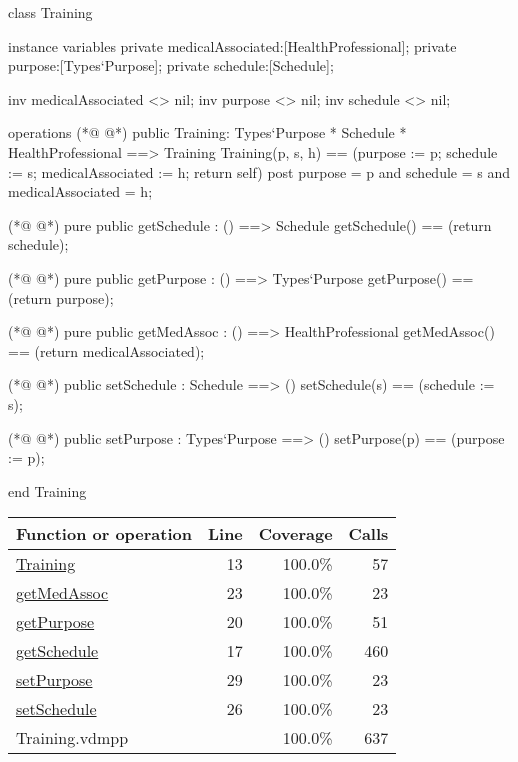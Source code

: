\begin{vdmpp}[breaklines=true]
class Training
 
instance variables
 private medicalAssociated:[HealthProfessional];
 private purpose:[Types`Purpose];
 private schedule:[Schedule];

 inv medicalAssociated <> nil;
 inv purpose <> nil;
 inv schedule <> nil;

operations
(*@
\label{Training:13}
@*)
 public Training: Types`Purpose * Schedule * HealthProfessional ==> Training
   Training(p, s, h) == (purpose := p; schedule := s; medicalAssociated := h; return self)
 post purpose = p and schedule = s and medicalAssociated = h;

(*@
\label{getSchedule:17}
@*)
 pure public getSchedule : () ==> Schedule
   getSchedule() == (return schedule);
 
(*@
\label{getPurpose:20}
@*)
  pure public getPurpose : () ==> Types`Purpose
  getPurpose() == (return purpose); 
 
(*@
\label{getMedAssoc:23}
@*)
 pure public getMedAssoc : () ==> HealthProfessional
  getMedAssoc() == (return medicalAssociated); 

(*@
\label{setSchedule:26}
@*)
 public setSchedule : Schedule ==> ()
   setSchedule(s) == (schedule := s);
 
(*@
\label{setPurpose:29}
@*)
 public setPurpose : Types`Purpose ==> ()
   setPurpose(p) == (purpose := p);
 
 end Training
\end{vdmpp}
\bigskip
\begin{longtable}{|l|r|r|r|}
\hline
Function or operation & Line & Coverage & Calls \\
\hline
\hline
\hyperref[Training:13]{Training} & 13&100.0\% & 57 \\
\hline
\hyperref[getMedAssoc:23]{getMedAssoc} & 23&100.0\% & 23 \\
\hline
\hyperref[getPurpose:20]{getPurpose} & 20&100.0\% & 51 \\
\hline
\hyperref[getSchedule:17]{getSchedule} & 17&100.0\% & 460 \\
\hline
\hyperref[setPurpose:29]{setPurpose} & 29&100.0\% & 23 \\
\hline
\hyperref[setSchedule:26]{setSchedule} & 26&100.0\% & 23 \\
\hline
\hline
Training.vdmpp & & 100.0\% & 637 \\
\hline
\end{longtable}

